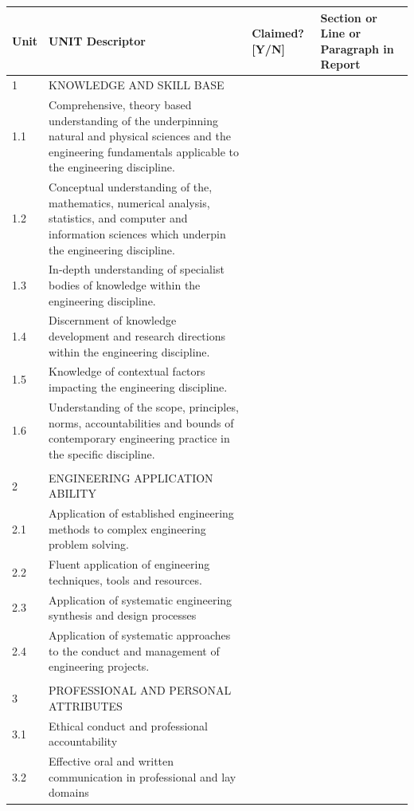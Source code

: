\documentclass[11pt]{article}
\newenvironment{localsize}[1]
{%
  \clearpage
  \let\orignewcommand\newcommand
  \let\newcommand\renewcommand
  \makeatletter
  \makeatother
  \let\newcommand\orignewcommand
}
{%
  \clearpage
}
\begin{document}
\begin{localsize}{10}

\begin{table}[!h] \centering
 \begin{tabular}{|p{0.75cm} | p{8cm} | p{1.5cm} | p{2cm} |} 
 \hline
  Unit & UNIT Descriptor & Claimed? [Y/N] & Section or Line or Paragraph in Report\\ \hline
   1 & KNOWLEDGE AND SKILL BASE & & \\ \hline
   1.1 & Comprehensive, theory based understanding of the underpinning natural and physical sciences and the engineering fundamentals applicable to the engineering discipline. & & \\ \hline
   1.2 & Conceptual understanding of the, mathematics, numerical analysis, statistics, and computer and information sciences which underpin the engineering discipline. & & \\ \hline
   1.3 & In-depth understanding of specialist bodies of knowledge within the engineering discipline. & & \\ \hline
   1.4 & Discernment of knowledge development and research directions within the
engineering discipline. & & \\ \hline
   1.5 & Knowledge of contextual factors impacting the
engineering discipline. & & \\ \hline
   1.6 & Understanding of the scope, principles, norms, accountabilities and bounds of contemporary engineering practice in the specific discipline. & & \\ \hline
   & & & \\ \hline
   2 & ENGINEERING APPLICATION ABILITY & & \\ \hline
   2.1 & Application of established engineering methods to complex engineering problem solving. & & \\ \hline
   2.2 & Fluent application of engineering techniques, tools and resources. & & \\ \hline
   2.3 & Application of systematic engineering synthesis and design processes & & \\ \hline
   2.4 & Application of systematic approaches to the conduct and management of engineering projects. & & \\ \hline
   & & & \\ \hline
   3 & PROFESSIONAL AND PERSONAL ATTRIBUTES & & \\ \hline
   3.1 & Ethical conduct and professional accountability & & \\ \hline
   3.2 & Effective oral and written communication in professional and lay domains & & \\ \hline

\end{tabular}
\end{table}
\end{localsize}
\end{document}
